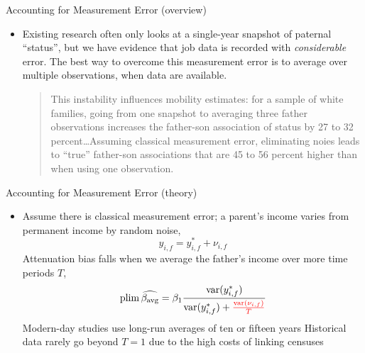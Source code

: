 \documentclass[dvipsnames]{beamer}
\newcommand{\var}{\operatorname{var}}
\begin{document}
%
\begin{frame}{Accounting for Measurement Error (overview)}
  \begin{itemize}
  \item Existing research often only looks at a single-year snapshot of paternal ``status'', but we have evidence that job data is recorded with \emph{considerable} error.
    \vitem The best way to overcome this measurement error is to average over multiple observations, when data are available.
    \vfill
    \begin{quote}
      This instability influences mobility estimates: for a sample of white families, going from one snapshot to averaging three father observations increases the father-son association of status by 27 to 32 percent\ldots Assuming classical measurement error, eliminating noies leads to ``true'' father-son associations that are 45 to 56 percent higher than when using one observation.
    \end{quote}
  \end{itemize}
\end{frame}
%
\begin{frame}{Accounting for Measurement Error (theory)}
  \begin{itemize}
  \item Assume there is classical measurement error; a parent's income varies from permanent income by random noise,
    \[y_{i, f} = y_{i, f}^\ast + \nu_{i, f}\]
    \vitem Attenuation bias falls when we average the father's income over more time periods $T$,
    \[
\operatorname{plim}\widehat{\beta_{\text{avg}}} = \beta_1 \frac{\var(y^\ast_{i, f})}{\var (y^\ast_{i, f}) + \rd{\frac{\var(\nu_{i, f})}{T}}}
    \]
    \vitem Modern-day studies use long-run averages of ten or fifteen years
    \vitem Historical data rarely go beyond $T = 1$ due to the high costs of linking censuses
  \end{itemize}
\end{frame}
%
\end{document}
